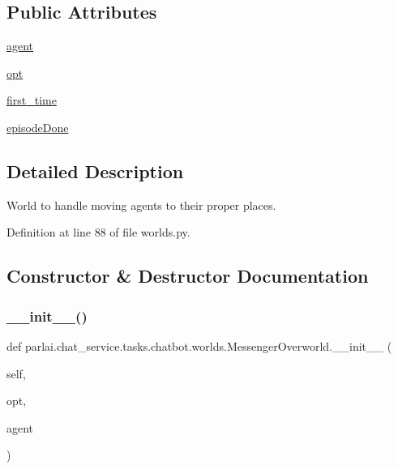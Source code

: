 \subsection*{Public Attributes}
\begin{DoxyCompactItemize}
\item 
\hyperlink{classparlai_1_1chat__service_1_1tasks_1_1chatbot_1_1worlds_1_1MessengerOverworld_a2c9b1c253f93506640d00dcd975548d9}{agent}
\item 
\hyperlink{classparlai_1_1chat__service_1_1tasks_1_1chatbot_1_1worlds_1_1MessengerOverworld_afc4bf12a3b71a4fad010c33c66d20f19}{opt}
\item 
\hyperlink{classparlai_1_1chat__service_1_1tasks_1_1chatbot_1_1worlds_1_1MessengerOverworld_a0c0c4647495d5b6c8df4aeb10a3524a9}{first\+\_\+time}
\item 
\hyperlink{classparlai_1_1chat__service_1_1tasks_1_1chatbot_1_1worlds_1_1MessengerOverworld_a7f4fa1b277a998f3e9f4847f4d12b0d3}{episode\+Done}
\end{DoxyCompactItemize}


\subsection{Detailed Description}
\begin{DoxyVerb}World to handle moving agents to their proper places.
\end{DoxyVerb}
 

Definition at line 88 of file worlds.\+py.



\subsection{Constructor \& Destructor Documentation}
\mbox{\label{classparlai_1_1chat__service_1_1tasks_1_1chatbot_1_1worlds_1_1MessengerOverworld_ab8e8320ea06a0972b48eb5f068a55b25}} 
\subsubsection{\texorpdfstring{\+\_\+\+\_\+init\+\_\+\+\_\+()}{\_\_init\_\_()}}
{\footnotesize\ttfamily def parlai.\+chat\+\_\+service.\+tasks.\+chatbot.\+worlds.\+Messenger\+Overworld.\+\_\+\+\_\+init\+\_\+\+\_\+ (\begin{DoxyParamCaption}\item[{}]{self,  }\item[{}]{opt,  }\item[{}]{agent }\end{DoxyParamCaption})}



